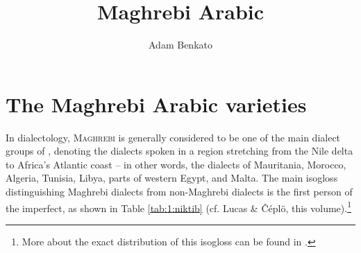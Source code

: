 \documentclass[output=paper]{langsci/langscibook}
\author{Adam Benkato\affiliation{University of California, Berkeley}}
\title{Maghrebi Arabic}
\begin{document}
\section{The Maghrebi Arabic varieties}

In  dialectology, \textsc{Maghrebi} is generally considered to be one of the main dialect groups of , denoting the dialects spoken in a region stretching from the Nile delta to Africa’s Atlantic coast -- in other words, the dialects of Mauritania, Morocco, Algeria, Tunisia, Libya, parts of western Egypt, and Malta. The main isogloss distinguishing Maghrebi dialects from non-Maghrebi dialects is the first person of the imperfect, as shown in Table \ref{tab:1:niktib} (cf. Lucas \& Čéplö, this volume).\footnote{More about the exact distribution of this isogloss can be found in \citet{Behnstedt2016niktib}.}


\begin{table}
\caption{First-person imperfect `write' in Maghrebi and non-Maghrebi Arabic}
\label{tab:1:niktib}
\end{table}
\end{document}
